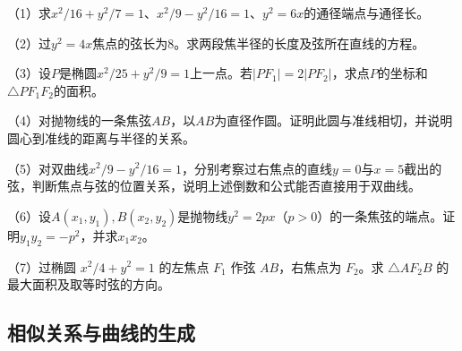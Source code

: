 \begin{exercise}
\mbox{}\par\nobreak

\begin{samepage}
（1）求\(x^2/16+y^2/7=1\)、\(x^2/9-y^2/16=1\)、\(y^2=6x\)的通径端点与通径长。
\par
\end{samepage}

\begin{samepage}
（2）过\(y^2=4x\)焦点的弦长为\(8\)。求两段焦半径的长度及弦所在直线的方程。
\par
\end{samepage}

\begin{samepage}
（3）设\(P\)是椭圆\(x^2/25+y^2/9=1\)上一点。若\(|PF_1|=2|PF_2|\)，求点\(P\)的坐标和\(\triangle PF_1F_2\)的面积。
\par
\end{samepage}

\begin{samepage}
（4）对抛物线的一条焦弦\(AB\)，以\(AB\)为直径作圆。证明此圆与准线相切，并说明圆心到准线的距离与半径的关系。
\par
\end{samepage}

\begin{samepage}
（5）对双曲线\(x^2/9-y^2/16=1\)，分别考察过右焦点的直线\(y=0\)与\(x=5\)截出的弦，判断焦点与弦的位置关系，说明上述倒数和公式能否直接用于双曲线。
\par
\end{samepage}

\begin{samepage}
（6）设\(A(x_1,y_1),B(x_2,y_2)\)是抛物线\(y^2=2px\)（\(p>0\)）的一条焦弦的端点。证明\(y_1y_2=-p^2\)，并求\(x_1x_2\)。
\par
\end{samepage}
\begin{samepage}
（7）过椭圆 \(x^2/4+y^2=1\) 的左焦点 \(F_1\) 作弦 \(AB\)，右焦点为 \(F_2\)。求 \(\triangle AF_2B\) 的最大面积及取等时弦的方向。
\par\end{samepage}
\end{exercise}

\subsection{相似关系与曲线的生成}
\label{subsec:quadratic-similarity-and-generation}

